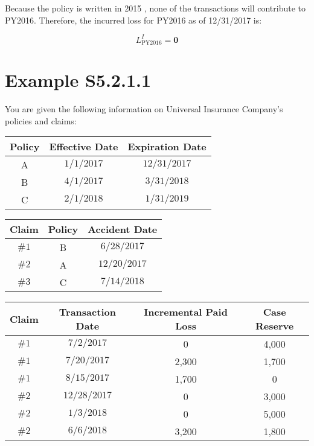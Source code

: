 \documentclass[10pt]{article}
\begin{document}
Because the policy is written in 2015 , none of the transactions will contribute to PY2016. Therefore, the incurred loss for PY2016 as of 12/31/2017 is:

$$
L_{\mathrm{PY} 2016}^{I}=\mathbf{0}
$$

\section{Example S5.2.1.1}
You are given the following information on Universal Insurance Company's policies and claims:

\begin{center}
\begin{tabular}{|c|c|c|}
\hline
Policy & Effective Date & Expiration Date \\
\hline
A & $1 / 1 / 2017$ & $12 / 31 / 2017$ \\
\hline
B & $4 / 1 / 2017$ & $3 / 31 / 2018$ \\
\hline
C & $2 / 1 / 2018$ & $1 / 31 / 2019$ \\
\hline
\end{tabular}
\end{center}

\begin{center}
\begin{tabular}{|c|c|c|}
\hline
Claim & Policy & Accident Date \\
\hline
$\# 1$ & B & $6 / 28 / 2017$ \\
\hline
$\# 2$ & A & $12 / 20 / 2017$ \\
\hline
$\# 3$ & C & $7 / 14 / 2018$ \\
\hline
\end{tabular}
\end{center}

\begin{center}
\begin{tabular}{|c|c|c|c|}
\hline
Claim & Transaction Date & Incremental Paid Loss & Case Reserve \\
\hline
$\# 1$ & $7 / 2 / 2017$ & 0 & 4,000 \\
\hline
$\# 1$ & $7 / 20 / 2017$ & 2,300 & 1,700 \\
\hline
$\# 1$ & $8 / 15 / 2017$ & 1,700 & 0 \\
\hline
$\# 2$ & $12 / 28 / 2017$ & 0 & 3,000 \\
\hline
$\# 2$ & $1 / 3 / 2018$ & 0 & 5,000 \\
\hline
$\# 2$ & $6 / 6 / 2018$ & 3,200 & 1,800 \\
\hline
\end{tabular}
\end{center}
\end{document}
